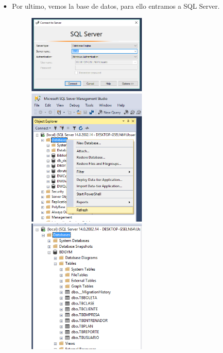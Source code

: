 \documentclass[%
 reprint,
 amsmath,amssymb,
 aps,
]{revtex4-1}
\begin{document}
\begin{itemize}
\begin{figure}[htb]
\end{figure}
\\
\\
\\
\\
\\
\\
\\
	\item Por ultimo, vemos la base de datos, para ello entramos a SQL Server.
\begin{figure}[htb]
\begin{center}
\includegraphics[width=6cm]{./Imagenes/5}
\includegraphics[width=6cm]{./Imagenes/5-2}
\includegraphics[width=6cm]{./Imagenes/5-3}
\end{center}
\end{figure}
\\

\end{itemize}
\end{document}
